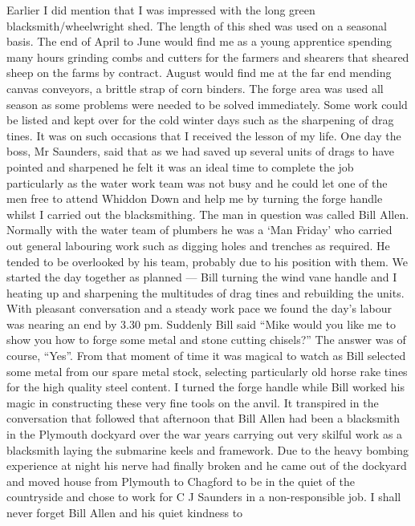 
Earlier I did mention that I was impressed with the long green
blacksmith/wheelwright shed. The length of this shed was used on a seasonal
basis. The end of April to June would find me as a young apprentice spending
many hours grinding combs and cutters for the farmers and shearers that sheared
sheep on the farms by contract. August would find me at the far end mending
canvas conveyors, a brittle strap of corn binders. The forge area was used all
season as some problems were needed to be solved immediately. Some work could
be listed and kept over for the cold winter days such as the sharpening of drag
tines. It was on such occasions that I received the lesson of my life. One day
the boss, Mr Saunders, said that as we had saved up several units of drags to
have pointed and sharpened he felt it was an ideal time to complete the job
particularly as the water work team was not busy and he could let one of the
men free to attend Whiddon Down and help me by turning the forge handle whilst
I carried out the blacksmithing. The man in question was called Bill Allen.
Normally with the water team of plumbers he was a ‘Man Friday' who carried out
general labouring work such as digging holes and trenches as required. He
tended to be overlooked by his team, probably due to his position with them. We
started the day together as planned --- Bill turning the wind vane handle and I
heating up and sharpening the multitudes of drag tines and rebuilding the
units. With pleasant conversation and a steady work pace we found the day's
labour was nearing an end by 3.30 pm. Suddenly Bill said ``Mike would you like
me to show you how to forge some metal and stone cutting chisels?'' The answer
was of course, ``Yes''. From that moment of time it was magical to watch as
Bill selected some metal from our spare metal stock, selecting particularly old
horse rake tines for the high quality steel content. I turned the forge handle
while Bill worked his magic in constructing these very fine tools on the anvil.
It transpired in the conversation that followed that afternoon that Bill Allen
had been a blacksmith in the Plymouth dockyard over the war years carrying out
very skilful work as a blacksmith laying the submarine keels and framework. Due
to the heavy bombing experience at night his nerve had finally broken and he
came out of the dockyard and moved house from Plymouth to Chagford to be in the
quiet of the countryside and chose to work for C J Saunders in a
non-responsible job. I shall never forget Bill Allen and his quiet kindness to
